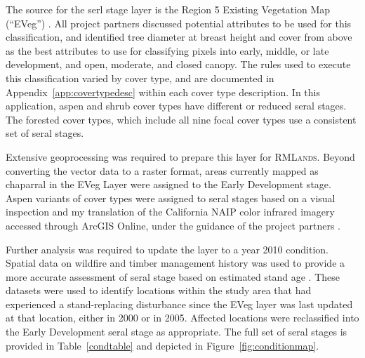 The source for the serl stage layer is the Region 5 Existing Vegetation Map (``EVeg'') \citep{USDAForestService2009}. All project partners discussed potential attributes to be used for this classification, and identified tree diameter at breast height and cover from above as the best attributes to use for classifying pixels into early, middle, or late development, and open, moderate, and closed canopy. The rules used to execute this classification varied by cover type, and are documented in Appendix~\ref{app:covertypedesc} within each cover type description. In this application, aspen and shrub cover types have different or reduced seral stages. The forested cover types, which include all nine focal cover types use a consistent set of seral stages.

Extensive geoprocessing was required to prepare this layer for \textsc{RMLands}. Beyond converting the vector data to a raster format, areas currently mapped as chaparral in the EVeg Layer were assigned to the Early Development stage. Aspen variants of cover types were assigned to seral stages based on a visual inspection and my translation of the California NAIP color infrared imagery accessed through ArcGIS Online, under the guidance of the project partners \citep{CaliforniaDepartmentofFishandWildlife2010}. 

Further analysis was required to update the layer to a year 2010 condition. Spatial data on wildfire and timber management history was used to provide a more accurate assessment of seral stage based on estimated stand age \citep{USDAForestService2012,USDAForestService2012a}. These datasets were used to identify locations within the study area that had experienced a stand-replacing disturbance since the EVeg layer was last updated at that location, either in 2000 or in 2005. Affected locations were reclassified into the Early Development seral stage as appropriate. The full set of seral stages is provided in Table~\ref{condtable} and depicted in Figure~\ref{fig:conditionmap}.


